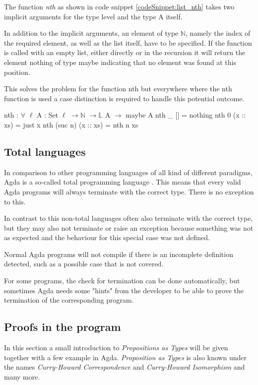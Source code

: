 The function \emph{nth} as shown in code snippet \ref{codeSnippet:list_nth} takes two implicit arguments for the type level and the type A itself.

In addition to the implicit arguments, an element of type $\mathbb{N}$, namely the index of the required element, as well as the list itself, have to be specified.
If the function is called with an empty list, either directly or in the recursion it will return the element nothing of type maybe indicating that no element was found at this position.

This solves the problem for the function nth but everywhere where the nth function is used a case distinction is required to handle this potential outcome.
\begin{codesnippet}[mathescape=true, caption={Definition of nth function in Agda}, label={codeSnippet:list_nth}]
nth : $\forall$ {$\ell$} {A : Set $\ell$} $\rightarrow \mathbb{N}$ $\rightarrow \mathbb{L}$ A $\rightarrow$ maybe A
nth _ [] = nothing
nth 0 (x :: xs) = just x
nth (suc n) (x :: xs) = nth n xs
\end{codesnippet}

\subsection{Total languages}\label{section:total_languages}
In comparison to other programming languages of all kind of different paradigms, Agda is a so-called total programming language \cite{AgdaReadTheDocs}.
This means that every valid Agda programs will always terminate with the correct type. There is no exception to this.

In contrast to this non-total languages often also terminate with the correct type, but they may also not terminate or raise an exception because something was not as expected and the behaviour for this special case was not defined.

Normal Agda programs will not compile if there is an incomplete definition detected, such as a possible case that is not covered.

For some programs, the check for termination can be done automatically, but sometimes Agda needs some "hints" from the developer to be able to prove the termination of the corresponding program.

\subsection{Proofs in the program}\label{section:agda_proofs}
In this section a small introduction to \emph{Propositions as Types}\cite{10.1145/2699407} will be given together with a few example in Agda. \emph{Proposition as Types} is also known under the names \emph{Curry-Howard Correspondence}\cite{10.5555/1076265} and \emph{Curry-Howard Isomorphism}\cite{10.1145/2841316} and many more.

